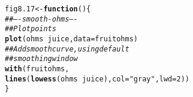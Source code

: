 \documentclass[12pt, a4paper,  BCOR=8.25mm, DIV=15]{scrartcl}\usepackage[]{graphicx}\usepackage[]{color}
\makeatletter
\newcommand{\hlnum}[1]{\textcolor[rgb]{0.686,0.059,0.569}{#1}}%
\newcommand{\hlstr}[1]{\textcolor[rgb]{0.192,0.494,0.8}{#1}}%
\newcommand{\hlcom}[1]{\textcolor[rgb]{0.678,0.584,0.686}{\textit{#1}}}%
\newcommand{\hlopt}[1]{\textcolor[rgb]{0,0,0}{#1}}%
\newcommand{\hlstd}[1]{\textcolor[rgb]{0.345,0.345,0.345}{#1}}%
\newcommand{\hlkwa}[1]{\textcolor[rgb]{0.161,0.373,0.58}{\textbf{#1}}}%
\newcommand{\hlkwb}[1]{\textcolor[rgb]{0.69,0.353,0.396}{#1}}%
\newcommand{\hlkwc}[1]{\textcolor[rgb]{0.333,0.667,0.333}{#1}}%
\newcommand{\hlkwd}[1]{\textcolor[rgb]{0.737,0.353,0.396}{\textbf{#1}}}%
\newenvironment{kframe}{%
 \def\at@end@of@kframe{}%
 \ifinner\ifhmode%
  \def\at@end@of@kframe{\end{minipage}}%
  \begin{minipage}{\columnwidth}%
 \fi\fi%
 \def\FrameCommand##1{\hskip\@totalleftmargin \hskip-\fboxsep
 \colorbox{shadecolor}{##1}\hskip-\fboxsep
     \hskip-\linewidth \hskip-\@totalleftmargin \hskip\columnwidth}%
 \MakeFramed {\advance\hsize-\width
   \@totalleftmargin\z@ \linewidth\hsize
   \@setminipage}}%
 {\par\unskip\endMakeFramed%
 \at@end@of@kframe}
\newenvironment{knitrout}{}{} %
\makeatother
\begin{document}
\begin{knitrout}
\color{fgcolor}\begin{kframe}
\begin{alltt}
\hlstd{fig8.17} \hlkwb{<-} \hlkwa{function}\hlstd{()\{}
\hlcom{## ---- smooth-ohms ----}
\hlcom{## Plot points}
\hlkwd{plot}\hlstd{(ohms} \hlopt{~} \hlstd{juice,} \hlkwc{data}\hlstd{=fruitohms)}
\hlcom{## Add smooth curve, using default}
\hlcom{## smoothing window}
\hlkwd{with}\hlstd{(fruitohms,}
     \hlkwd{lines}\hlstd{(}\hlkwd{lowess}\hlstd{(ohms} \hlopt{~} \hlstd{juice),} \hlkwc{col}\hlstd{=}\hlstr{"gray"}\hlstd{,} \hlkwc{lwd}\hlstd{=}\hlnum{2}\hlstd{))}
\hlstd{\}}
\end{alltt}
\end{kframe}
\end{knitrout}
\end{document}
